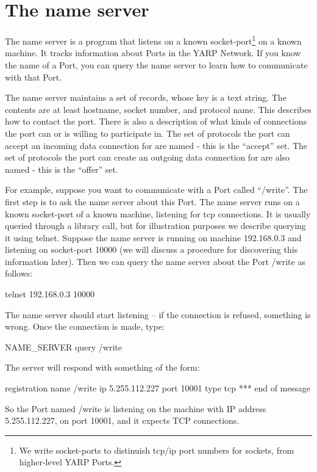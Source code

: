 \documentclass[a4]{article}
\begin{document}
\section{The name server}

The name server is a program that listens on a known socket-port\footnote{We
write socket-ports to distinuish tcp/ip port numbers for sockets, 
from higher-level YARP Ports.}
on a known machine.
%
It tracks information about Ports in the YARP Network.
%
%
If you know the name
of a Port, you can query the name server to learn how to communicate
with that Port.

The name server maintains a set of records, whose key is a text
string.  The contents are at least hostname, socket number, and
protocol name.  This describes how to contact the port.  There is also
a description of what kinds of connections the port can or is willing
to participate in.  The set of protocols the port can accept an
incoming data connection for are named - this is the ``accept'' set.
The set of protocols the port can create an outgoing data connection
for are also named - this is the ``offer'' set.

For example, suppose you want to communicate with a Port called
``/write''.  The first step is to ask the name server about this
Port.  The name server runs on a known socket-port of a known machine,
listening for tcp connections.
It is usually queried through a library call, but for illustration
purposes we describe
querying it using telnet.  Suppose the name server is running on
machine 192.168.0.3 and listening on socket-port 10000 (we will
discuss a procedure for discovering this information later).
Then we can query the name server about the Port /write as follows:


\begin{code}
telnet 192.168.0.3 10000
\end{code}
%
The name server should start listening -- if the connection is refused,
something is wrong.  Once the connection is made, type:
%
\begin{code}
NAME_SERVER query /write
\end{code}
%
The server will respond with something of the form:
%
\begin{code}
registration name /write ip 5.255.112.227 port 10001 type tcp
*** end of message
\end{code}
%
So the Port named /write is listening on the machine with
IP address 5.255.112.227, on port 10001, and it expects TCP
connections.
\end{document}
